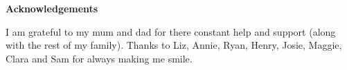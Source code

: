 \thispagestyle{empty}

\begin{center}
    {\LARGE\bf Acknowledgements}
\end{center}

I am grateful to my mum and dad for there constant help and support (along with the rest of my family). Thanks to Liz, Annie, Ryan, Henry, Josie, Maggie, Clara and Sam for always making me smile.